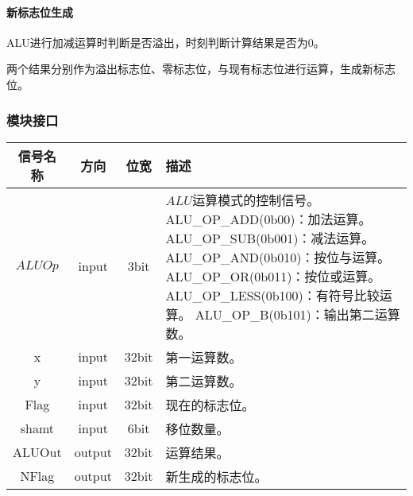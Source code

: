 \documentclass[main.tex]{subfiles}
\begin{document}
\paragraph{新标志位生成}
ALU进行加减运算时判断是否溢出，时刻判断计算结果是否为0。

两个结果分别作为溢出标志位、零标志位，与现有标志位进行运算，生成新标志位。

\subsubsection{模块接口}
\begin{center}
    \begin{tabular}{c c c l}
        \toprule
        信号名称 & 方向 & 位宽 & 描述 \\
        \midrule
        $ALUOp$ & input & 3bit & \makecell[lt]{
            $ALU$运算模式的控制信号。\\
            ALU\_OP\_ADD(0b00)：加法运算。\\
            ALU\_OP\_SUB(0b001)：减法运算。\\
            ALU\_OP\_AND(0b010)：按位与运算。 \\
            ALU\_OP\_OR(0b011)：按位或运算。 \\
            ALU\_OP\_LESS(0b100)：有符号比较运算。 \\
            ALU\_OP\_B(0b101)：输出第二运算数。 \\
        } \\
        \midrule
        x & input & 32bit & 第一运算数。 \\
        y & input & 32bit & 第二运算数。 \\
        Flag & input & 32bit & 现在的标志位。\\
        shamt & input & 6bit & 移位数量。\\
        ALUOut & output & 32bit & 运算结果。 \\
        NFlag & output & 32bit & 新生成的标志位。 \\
        \bottomrule
    \end{tabular}
\end{center}

\clearpage
\end{document}
